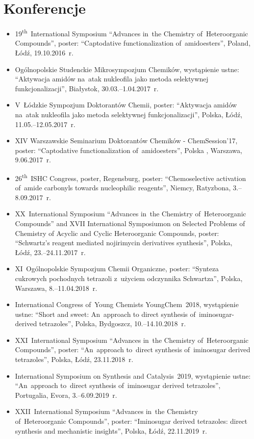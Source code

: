 \section{Konferencje}\label{intro:conferences}
\begin{fullwidth}
\begin{itemize}
  \item 19\textsuperscript{th}~International Symposium \enquote{Advances in~the Chemistry of~Heteroorganic Compounds}, poster: \enquote{Captodative functionalization of~amidoesters}, Poland, Łódź, 19.10.2016~r.
  \item Ogólnopolskie Studenckie Mikrosympozjum Chemików, wystąpienie ustne: \enquote{Aktywacja amidów na~atak nukleofila jako metoda selektywnej funkcjonalizacji}, Białystok, 30.03.\-–1.04.2017~r.
  \item V~Łódzkie Sympozjum Doktorantów Chemii, poster: \enquote{Aktywacja amidów na~atak nukleofila jako metoda selektywnej funkcjonalizacji}, Polska, Łódź, 11.05.\-–12.05.2017~r.
  \item XIV Warszawskie Seminarium Doktorantów Chemików - ChemSession’17, poster: \enquote{Captodative functionalization of~amidoesters}, Polska , Warszawa, 9.06.2017~r.
  \item 26\textsuperscript{th}~ISHC Congress, poster, Regensburg, poster: \enquote{Chemoselective activation of~amide carbonyls towards nucleophilic reagents}, Niemcy, Ratyzbona, 3.\-–8.09.2017~r.
  \item XX~International Symposium \enquote{Advances in~the Chemistry of~Heteroorganic Compounds} and XVII International Symposiumon on Selected Problems of Chemistry of Acyclic and Cyclic Heteroorganic Compounds, poster: \enquote{Schwartz’s reagent mediated nojirimycin derivatives synthesis}, Polska, Łódź, 23.\-–24.11.2017~r.
  \item XI~Ogólnopolskie Sympozjum Chemii Organiczne, poster: \enquote{Synteza cukrowych pochodnych tetrazoli z~użyciem odczynnika Schwartza}, Polska, Warszawa, 8.\-–11.04.2018~r.
  \item International Congress of~Young Chemists YoungChem~2018, wystąpienie ustne: \enquote{Short and sweet: An~approach to direct synthesis of~iminosugar-derived tetrazoles}, Polska, Bydgoszcz, 10.\-–14.10.2018~r.
  \item XXI~International Symposium \enquote{Advances in~the Chemistry of~Heteroorganic Compounds}, poster: \enquote{An~approach to~direct synthesis of~iminosugar derived tetrazoles}, Polska, Łódź, 23.11.2018~r.
  \item International Symposium on Synthesis and Catalysis~2019, wystąpienie ustne: \enquote{An~approach to~direct synthesis of~iminosugar derived tetrazoles}, Portugalia, Evora, 3.\-–6.09.2019~r.
  \item XXII~International Symposium \enquote{Advances in~the Chemistry of~Heteroorganic Compounds}, poster: \enquote{Iminosugar derived tetrazoles: direct synthesis and mechanistic insights}, Polska, Łódź, 22.11.2019~r.
\end{itemize}
\end{fullwidth}

